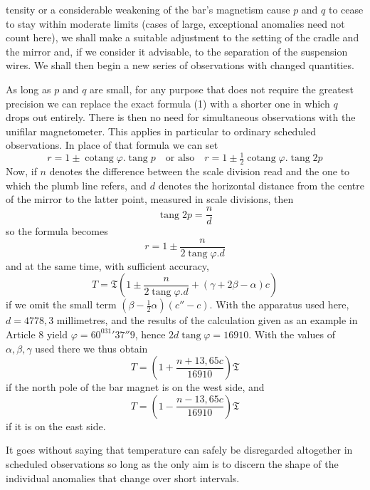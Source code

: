 tensity or a considerable weakening of the bar’s magnetism cause $p$ and $q$ to cease to stay within moderate limits (cases of large, exceptional anomalies need not count here), we shall make a suitable adjustment to the setting of the cradle and the mirror and, if we consider it advisable, to the separation of the suspension wires. We shall then begin a new series of observations with changed quantities.

As long as $p$ and $q$ are small, for any purpose that does not require the greatest precision we can replace the exact formula (1) with a shorter one in which $q$ drops out entirely. There is then no need for simultaneous observations with the unifilar magnetometer. This applies in particular to ordinary scheduled observations. In place of that formula we can set
\[
r=1\pm\operatorname{cotang}\varphi.\operatorname{tang}p\quad\text{or also}\quad r=1\pm\tfrac12\operatorname{cotang}\varphi.\operatorname{tang}2p
\]
Now, if $n$ denotes the difference between the scale division read and the one to which the plumb line refers, and $d$ denotes the horizontal distance from the centre of the mirror to the latter point, measured in scale divisions, then
\[
\operatorname{tang}2p=\frac{n}{d}
\]
so the formula becomes
\[
r=1\pm\frac{n}{2\operatorname{tang}\varphi.d}
\]
and at the same time, with sufficient accuracy,
\[
T=\mathfrak{T}(1\pm\frac{n}{2\operatorname{tang}\varphi.d}+(\gamma+2\beta-\alpha)c)
\]
if we omit the small term $(\beta-\tfrac12\alpha)(c''-c)$. With the apparatus used here, $d=4778{,}3$ millimetres, and the results of the calculation given as an example in Article 8 yield $\varphi=60^031'37''9$, hence $2d\operatorname{tang}\varphi=16910$. With the values of $\alpha,\beta,\gamma$ used there we thus obtain
\[
T=(1+\frac{n+13{,}65c}{16910})\mathfrak{T}
\]
if the north pole of the bar magnet is on the west side, and
\[
T=(1-\frac{n-13{,}65c}{16910})\mathfrak{T}
\]
if it is on the east side.

It goes without saying that temperature can safely be disregarded altogether in scheduled observations so long as the only aim is to discern the shape of the individual anomalies that change over short intervals.

